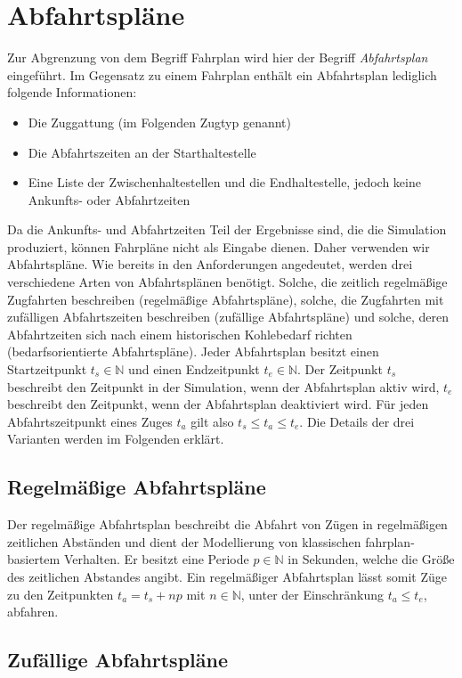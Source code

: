 \section{Abfahrtspläne}

Zur Abgrenzung von dem Begriff Fahrplan wird hier der Begriff \emph{Abfahrtsplan} eingeführt. Im Gegensatz zu einem Fahrplan enthält ein Abfahrtsplan lediglich folgende Informationen:
\begin{itemize}
    \item Die Zuggattung (im Folgenden Zugtyp genannt)
    \item Die Abfahrtszeiten an der Starthaltestelle
    \item Eine Liste der Zwischenhaltestellen und die Endhaltestelle, jedoch keine Ankunfts- oder Abfahrtzeiten
\end{itemize}
Da die Ankunfts- und Abfahrtzeiten Teil der Ergebnisse sind, die die Simulation produziert, können Fahrpläne nicht als Eingabe dienen. Daher verwenden wir Abfahrtspläne. Wie bereits in den Anforderungen angedeutet, werden drei verschiedene Arten von Abfahrtsplänen benötigt. Solche, die zeitlich regelmäßige Zugfahrten beschreiben (regelmäßige Abfahrtspläne), solche, die Zugfahrten mit zufälligen Abfahrtszeiten beschreiben (zufällige Abfahrtspläne) und solche, deren Abfahrtzeiten sich nach einem historischen Kohlebedarf richten (bedarfsorientierte Abfahrtspläne). Jeder Abfahrtsplan besitzt einen Startzeitpunkt $t_s \in \mathbb{N}$ und einen Endzeitpunkt $t_e \in \mathbb{N}$. Der Zeitpunkt $t_s$ beschreibt den Zeitpunkt in der Simulation, wenn der Abfahrtsplan aktiv wird, $t_e$ beschreibt den Zeitpunkt, wenn der Abfahrtsplan deaktiviert wird. Für jeden Abfahrtszeitpunkt eines Zuges $t_a$ gilt also $t_s\leq t_a \leq t_e$. Die Details der drei Varianten werden im Folgenden erklärt.

\subsection{Regelmäßige Abfahrtspläne}

Der regelmäßige Abfahrtsplan beschreibt die Abfahrt von Zügen in regelmäßigen zeitlichen Abständen und dient der Modellierung von klassischen fahrplan-basiertem Verhalten. Er besitzt eine Periode $p\in\mathbb{N}$ in Sekunden, welche die Größe des zeitlichen Abstandes angibt. Ein regelmäßiger Abfahrtsplan lässt somit Züge zu den Zeitpunkten $t_a=t_s+np$ mit $n\in\mathbb{N}$, unter der Einschränkung $t_a\leq t_e$, abfahren.

\subsection{Zufällige Abfahrtspläne}


